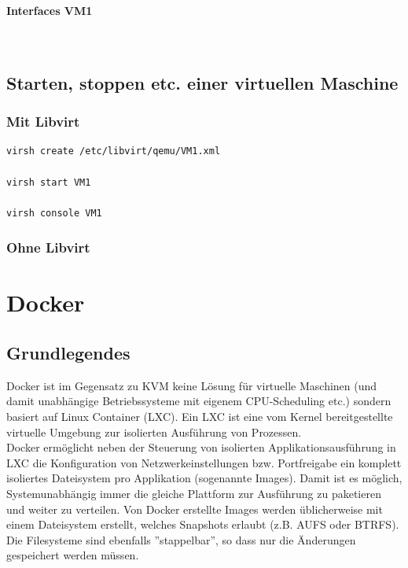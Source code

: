 
\paragraph{Interfaces VM1} \hfill \\

\subsection{Starten, stoppen etc. einer virtuellen Maschine}

\subsubsection{Mit Libvirt}


\begin{lstlisting}[language=bash]
virsh create /etc/libvirt/qemu/VM1.xml

virsh start VM1 

virsh console VM1
\end{lstlisting}

\subsubsection{Ohne Libvirt}

\section{Docker}
\subsection{Grundlegendes}
Docker ist im Gegensatz zu KVM keine Lösung für virtuelle Maschinen (und damit unabhängige Betriebssysteme mit eigenem CPU-Scheduling etc.) sondern basiert auf Linux Container (LXC). Ein LXC ist eine vom Kernel bereitgestellte virtuelle Umgebung zur isolierten Ausführung von Prozessen. \\

Docker ermöglicht neben der Steuerung von isolierten Applikationsausführung in LXC die Konfiguration von Netzwerkeinstellungen bzw. Portfreigabe ein komplett isoliertes Dateisystem pro Applikation (sogenannte Images). Damit ist es möglich, Systemunabhängig immer die gleiche Plattform zur Ausführung zu paketieren und weiter zu verteilen. Von Docker erstellte Images werden üblicherweise mit einem Dateisystem erstellt, welches Snapshots erlaubt (z.B. AUFS oder BTRFS). Die Filesysteme sind ebenfalls ''stappelbar'', so dass nur die Änderungen gespeichert werden müssen. \\

